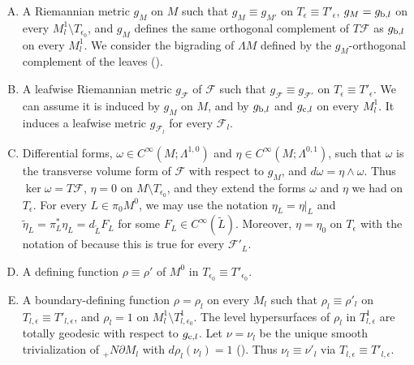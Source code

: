 \documentclass{memo-l}
\theoremstyle{plain}
\theoremstyle{definition}
\theoremstyle{remark}
\newcommand{\FF}{\mathcal{F}}
\numberwithin{section}{chapter}
\numberwithin{equation}{section}%
\begin{document}
\begin{enumerate}[(A)]
\item\label{i-(A): g_M} A Riemannian metric $g_M$ on $M$ such that $g_M\equiv g_{M'}$ on $T_\epsilon\equiv T'_\epsilon$, $g_M=g_{\text{\rm b},l}$ on every $M^1_l\setminus T_{\epsilon_0}$, and $g_M$ defines the same orthogonal complement of $T\FF$ as $g_{\text{\rm b},l}$ on every $M^1_l$.  We consider the bigrading of $\Lambda M$ defined by the $g_M$-orthogonal complement of the leaves ().

\item\label{i-(A): g_FF} A leafwise Riemannian metric $g_{\FF}$ of $\FF$ such that $g_{\FF}\equiv g_{\FF'}$ on $T_\epsilon\equiv T'_\epsilon$. We can assume it is induced by $g_M$ on $M$, and by $g_{\text{\rm b},l}$ and $g_{\text{\rm c},l}$ on every $M^1_l$. It induces a leafwise metric $g_{\FF_l}$ for every $\FF_l$.

\item\label{i-(A): d omega = eta wedge omega} Differential forms, $\omega\in C^\infty(M;\Lambda^{1,0})$ and $\eta\in C^\infty(M;\Lambda^{0,1})$, such that $\omega$ is the transverse volume form of $\FF$ with respect to $g_M$, and $d\omega=\eta\wedge\omega$. Thus $\ker\omega=T\FF$, $\eta=0$ on $M\setminus T_{\epsilon_0}$, and they extend the forms $\omega$ and $\eta$ we had on $T_\epsilon$. For every $L\in\pi_0M^0$, we may use the notation $\eta_L=\eta|_L$ and $\tilde\eta_L=\pi_L^*\eta_L=d_{\widetilde L}F_L$ for some $F_L\in C^\infty(\widetilde L)$. Moreover, $\eta=\eta_0$ on $T_\epsilon$ with the notation of  because this is true for every $\FF'_L$. 

\item\label{i-(A): rho} A defining function $\rho\equiv\rho'$ of $M^0$ in $T_{\epsilon_0}\equiv T'_{\epsilon_0}$.

\item\label{i-(A): rho_l} A boundary-defining function $\rho=\rho_l$ on every $M_l$ such that $\rho_l\equiv\rho'_l$ on $T_{l,\epsilon}\equiv T'_{l,\epsilon}$, and $\rho_l=1$ on $M^1_l\setminus T^1_{l,\epsilon_0}$. The level hypersurfaces of $\rho_l$ in $T^1_{l,\epsilon}$ are totally geodesic with respect to $g_{\text{\rm c},l}$. Let $\nu=\nu_l$ be the unique smooth trivialization of ${}_+N\partial M_l$ with $d\rho_l(\nu_l)=1$ (). Thus $\nu_l\equiv\nu'_l$ via $T_{l,\epsilon}\equiv T'_{l,\epsilon}$.

\end{enumerate}
\end{document}
